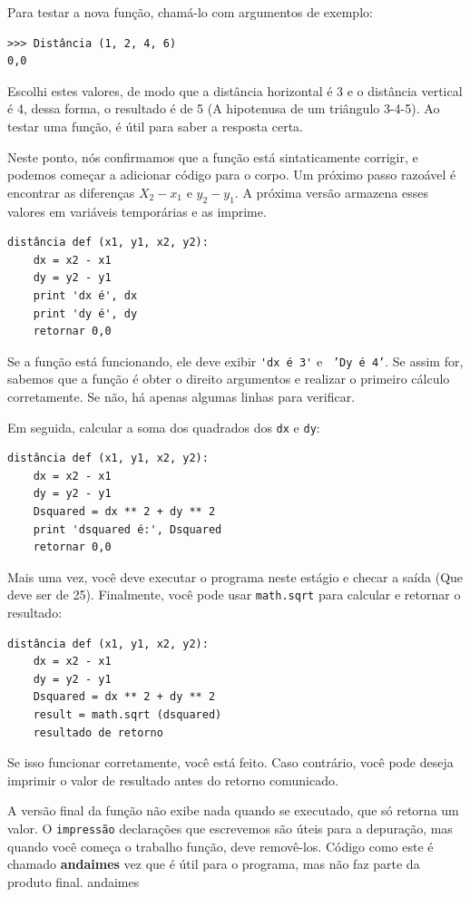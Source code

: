 \documentclass[10pt]{book}
\begin{document}
{{{Para testar a nova função, chamá-lo com argumentos de exemplo:

\begin{verbatim}
>>> Distância (1, 2, 4, 6)
0,0
\end{verbatim}
%
Escolhi estes valores, de modo que a distância horizontal é 3 e o
distância vertical é 4, dessa forma, o resultado é de 5
(A hipotenusa de um triângulo 3-4-5). Ao testar uma função, é
útil para saber a resposta certa.

Neste ponto, nós confirmamos que a função está sintaticamente
corrigir, e podemos começar a adicionar código para o corpo.
Um próximo passo razoável é encontrar as diferenças
$ X_2 - x_1 $ e $ y_2 - y_1 $. A próxima versão armazena esses valores em
variáveis ​​temporárias e as imprime.

\begin{verbatim}
distância def (x1, y1, x2, y2):
    dx = x2 - x1
    dy = y2 - y1
    print 'dx é', dx
    print 'dy é', dy
    retornar 0,0
\end{verbatim}
%
Se a função está funcionando, ele deve exibir \verb "'dx é 3'" e {\tt
'Dy é 4'}. Se assim for, sabemos que a função é obter o direito
argumentos e realizar o primeiro cálculo corretamente. Se não,
há apenas algumas linhas para verificar.

Em seguida, calcular a soma dos quadrados dos {\tt dx} e {\tt dy}:

\begin{verbatim}
distância def (x1, y1, x2, y2):
    dx = x2 - x1
    dy = y2 - y1
    Dsquared = dx ** 2 + dy ** 2
    print 'dsquared é:', Dsquared
    retornar 0,0
\end{verbatim}
%
Mais uma vez, você deve executar o programa neste estágio e checar a saída
(Que deve ser de 25).
Finalmente, você pode usar {\tt math.sqrt} para calcular e retornar o resultado:

\begin{verbatim}
distância def (x1, y1, x2, y2):
    dx = x2 - x1
    dy = y2 - y1
    Dsquared = dx ** 2 + dy ** 2
    result = math.sqrt (dsquared)
    resultado de retorno
\end{verbatim}
%
Se isso funcionar corretamente, você está feito. Caso contrário, você pode
deseja imprimir o valor de {resultado \tt} antes do retorno
comunicado.

A versão final da função não exibe nada quando se
executado, que só retorna um valor. O {\tt impressão} declarações que escrevemos
são úteis para a depuração, mas quando você começa o trabalho função,
deve removê-los. Código como este é chamado {\bf andaimes}
vez que é útil para o programa, mas não faz parte da
produto final.
\index{} andaimes

}}}
\end{document}
